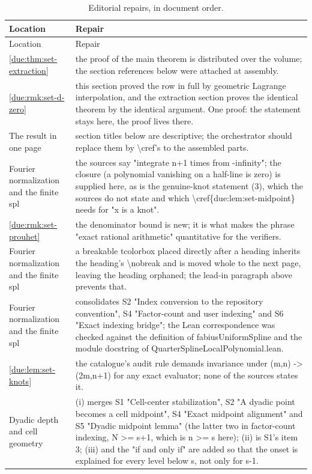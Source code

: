 \documentclass[11pt,oneside]{article}
\theoremstyle{plain}
\theoremstyle{definition}
\theoremstyle{remark}
\begin{document}
\begin{longtable}{@{}p{} p{}@{}}
\caption{Editorial repairs, in document order.}\label{due:tab:repairs}\\
\toprule
Location & Repair\\
\midrule
\endfirsthead
\toprule
Location & Repair\\
\midrule
\endhead
\cref{due:thm:set-extraction} & the proof of the main theorem is distributed over the volume; the section references below were attached at assembly.\\
\cref{due:rmk:set-d-zero} & this section proved the row in full by geometric Lagrange interpolation, and the extraction section proves the identical theorem by the identical argument. One proof: the statement stays here, the proof lives there.\\
The result in one page & section titles below are descriptive; the orchestrator should replace them by \textbackslash cref's to the assembled parts.\\
Fourier normalization and the finite spl & the sources say "integrate n+1 times from -infinity"; the closure (a polynomial vanishing on a half-line is zero) is supplied here, as is the genuine-knot statement (3), which the sources do not state and which \textbackslash cref\{due:lem:set-midpoint\} needs for "x is a knot".\\
\cref{due:rmk:set-prouhet} & the denominator bound is new; it is what makes the phrase "exact rational arithmetic" quantitative for the verifiers.\\
Fourier normalization and the finite spl & a breakable tcolorbox placed directly after a heading inherits the heading's \textbackslash nobreak and is moved whole to the next page, leaving the heading orphaned; the lead-in paragraph above prevents that.\\
Fourier normalization and the finite spl & consolidates S2 "Index conversion to the repository convention", S4 "Factor-count and user indexing" and S6 "Exact indexing bridge"; the Lean correspondence was checked against the definition of fabiusUniformSpline and the module docstring of QuarterSplineLocalPolynomial.lean.\\
\cref{due:lem:set-knots} & the catalogue's audit rule demands invariance under (m,n) -> (2m,n+1) for any exact evaluator; none of the sources states it.\\
Dyadic depth and cell geometry & (i) merges S1 "Cell-center stabilization", S2 "A dyadic point becomes a cell midpoint", S4 "Exact midpoint alignment" and S5 "Dyadic midpoint lemma" (the latter two in factor-count indexing, N >= s+1, which is n >= s here); (ii) is S1's item 3; (iii) and the "if and only if" are added so that the onset is explained for every level below s, not only for s-1.\\

\end{longtable}
\end{document}
